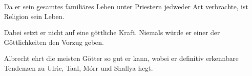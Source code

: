 
Da er sein gesamtes familiäres Leben unter Priestern jedweder Art verbrachte, ist Religion sein Leben.

Dabei setzt er nicht auf eine göttliche Kraft. Niemals würde er einer der Göttlichkeiten den Vorzug geben.

Albrecht ehrt die meisten Götter so gut er kann, wobei er definitiv erkennbare Tendenzen zu Ulric, Taal, Mórr und Shallya hegt.